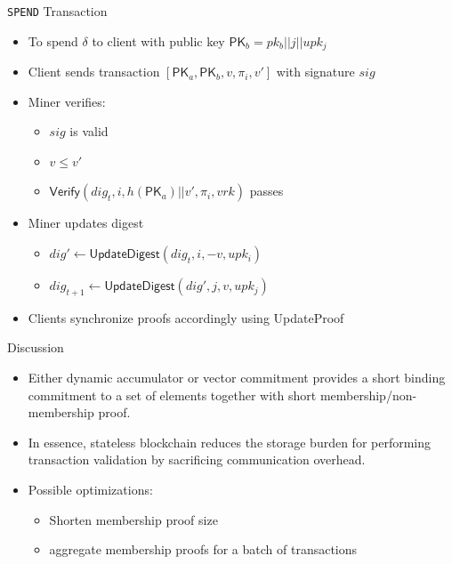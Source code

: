 \documentclass[biblatex,aspectratio=169,11pt]{mybeamer}
\begin{document}
\begin{frame}{\texttt{SPEND} Transaction}
  \begin{itemize}
    \item To spend $\delta$ to client with public key $\textsf{PK}_b = pk_b || j || upk_j$
    \item Client sends transaction $[\textsf{PK}_a, \textsf{PK}_b, v, \pi_i, v']$ with signature $sig$
    \item Miner verifies:
      \begin{itemize}
        \item $sig$ is valid
        \item $v \leq v'$
        \item $\textsf{Verify}(dig_t, i, h(\textsf{PK}_a) || v', \pi_i, vrk)$ passes
      \end{itemize}
    \item Miner updates digest
      \begin{itemize}
        \item $dig' \gets \textsf{UpdateDigest}(dig_t, i, -v, upk_i)$
        \item $dig_{t+1} \gets \textsf{UpdateDigest}(dig', j, v, upk_j)$
      \end{itemize}
    \item Clients synchronize proofs accordingly using UpdateProof
  \end{itemize}
\end{frame}

\begin{frame}{Discussion}
  \begin{itemize}[<+->]
    \item Either dynamic accumulator or vector commitment provides a \alert{short binding commitment} to a set of elements together with short \alert{membership/non-membership proof}.
    \item In essence, stateless blockchain reduces the storage burden for performing transaction validation by \alert{sacrificing communication overhead}.
    \item Possible optimizations: 
     \begin{itemize}[<+->]
       \item Shorten membership proof size
       \item aggregate membership proofs for a batch of transactions~\cite{boneh2018batching}
     \end{itemize}
  \end{itemize}
\end{frame}
\end{document}
